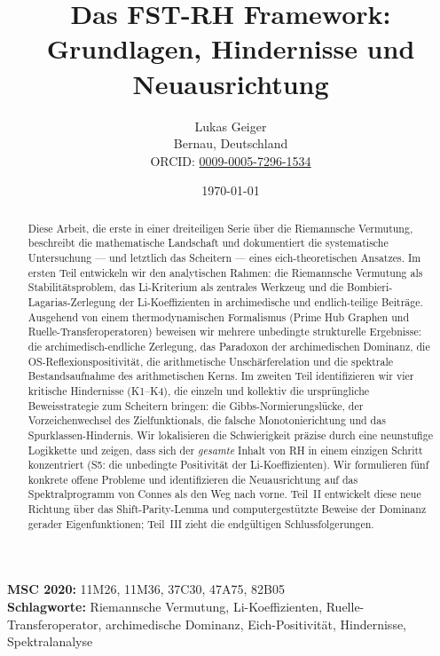 \documentclass[12pt,a4paper]{article}
\title{Das FST-RH Framework:\\
Grundlagen, Hindernisse und Neuausrichtung}
\author{Lukas Geiger\\
\small Bernau, Deutschland\\
\small ORCID: \href{https://orcid.org/0009-0005-7296-1534}{0009-0005-7296-1534}}
\date{\today}
\theoremstyle{definition}
\theoremstyle{remark}
\begin{document}
\maketitle

\begin{abstract}
Diese Arbeit, die erste in einer dreiteiligen Serie über die Riemannsche Vermutung, beschreibt die mathematische Landschaft und dokumentiert die systematische Untersuchung --- und letztlich das Scheitern --- eines eich-theoretischen Ansatzes. Im ersten Teil entwickeln wir den analytischen Rahmen: die Riemannsche Vermutung als Stabilitätsproblem, das Li-Kriterium als zentrales Werkzeug und die Bombieri-Lagarias-Zerlegung der Li-Koeffizienten in archimedische und endlich-teilige Beiträge. Ausgehend von einem thermodynamischen Formalismus (Prime Hub Graphen und Ruelle-Transferoperatoren) beweisen wir mehrere unbedingte strukturelle Ergebnisse: die archimedisch-endliche Zerlegung, das Paradoxon der archimedischen Dominanz, die OS-Reflexionspositivität, die arithmetische Unschärferelation und die spektrale Bestandsaufnahme des arithmetischen Kerns. Im zweiten Teil identifizieren wir vier kritische Hindernisse (K1--K4), die einzeln und kollektiv die ursprüngliche Beweisstrategie zum Scheitern bringen: die Gibbs-Normierungslücke, der Vorzeichenwechsel des Zielfunktionals, die falsche Monotonierichtung und das Spurklassen-Hindernis. Wir lokalisieren die Schwierigkeit präzise durch eine neunstufige Logikkette und zeigen, dass sich der \emph{gesamte} Inhalt von RH in einem einzigen Schritt konzentriert (S5: die unbedingte Positivität der Li-Koeffizienten). Wir formulieren fünf konkrete offene Probleme und identifizieren die Neuausrichtung auf das Spektralprogramm von Connes als den Weg nach vorne. Teil~II entwickelt diese neue Richtung über das Shift-Parity-Lemma und computergestützte Beweise der Dominanz gerader Eigenfunktionen; Teil~III zieht die endgültigen Schlussfolgerungen.
\end{abstract}

\noindent\textbf{MSC 2020:} 11M26, 11M36, 37C30, 47A75, 82B05\\
\textbf{Schlagworte:} Riemannsche Vermutung, Li-Koeffizienten, Ruelle-Transferoperator, archimedische Dominanz, Eich-Positivität, Hindernisse, Spektralanalyse

\newpage
\tableofcontents


\end{document}
